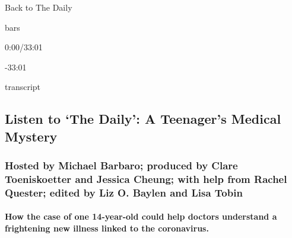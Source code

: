 Back to The Daily

bars

0:00/33:01

-33:01

transcript

\hypertarget{listen-to-the-daily-a-teenagers-medical-mystery-1}{%
\subsection{Listen to `The Daily': A Teenager's Medical
Mystery}\label{listen-to-the-daily-a-teenagers-medical-mystery-1}}

\hypertarget{hosted-by-michael-barbaro-produced-by-clare-toeniskoetter-and-jessica-cheung-with-help-from-rachel-quester-edited-by-liz-o-baylen-and-lisa-tobin}{%
\subsubsection{Hosted by Michael Barbaro; produced by Clare
Toeniskoetter and Jessica Cheung; with help from Rachel Quester; edited
by Liz O. Baylen and Lisa
Tobin}\label{hosted-by-michael-barbaro-produced-by-clare-toeniskoetter-and-jessica-cheung-with-help-from-rachel-quester-edited-by-liz-o-baylen-and-lisa-tobin}}

\hypertarget{how-the-case-of-one-14-year-old-could-help-doctors-understand-a-frightening-new-illness-linked-to-the-coronavirus}{%
\paragraph{How the case of one 14-year-old could help doctors understand
a frightening new illness linked to the
coronavirus.}\label{how-the-case-of-one-14-year-old-could-help-doctors-understand-a-frightening-new-illness-linked-to-the-coronavirus}}

